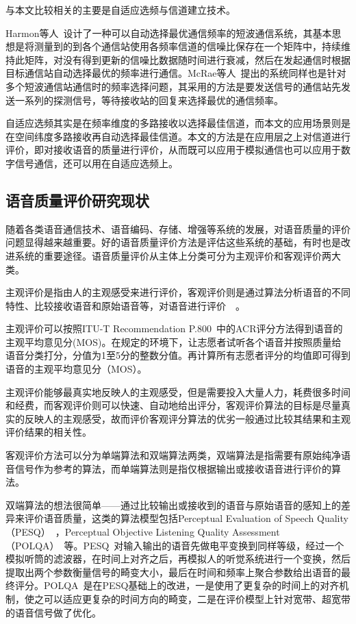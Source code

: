与本文比较相关的主要是自适应选频与信道建立技术。

Harmon等人~\cite{harmon1982adaptive}设计了一种可以自动选择最优通信频率的短波通信系统，其基本思想是将测量到的到各个通信站使用各频率信道的信噪比保存在一个矩阵中，持续维持此矩阵，对没有得到更新的信噪比数据随时间进行衰减，然后在发起通信时根据目标通信站自动选择最优的频率进行通信。McRae等人~\cite{mcrae1989frequency}提出的系统同样也是针对多个短波通信站通信时的频率选择问题，其采用的方法是要发送信号的通信站先发送一系列的探测信号，等待接收站的回复来选择最优的通信频率。

自适应选频其实是在频率维度的多路接收以选择最佳信道，而本文的应用场景则是在空间纬度多路接收再自动选择最佳信道。本文的方法是在应用层之上对信道进行评价，即对接收语音的质量进行评价，从而既可以应用于模拟通信也可以应用于数字信号通信，还可以用在自适应选频上。

\subsection{语音质量评价研究现状}

随着各类语音通信技术、语音编码、存储、增强等系统的发展，对语音质量的评价问题显得越来越重要。好的语音质量评价方法是评估这些系统的基础，有时也是改进系统的重要途径。语音质量评价从主体上分类可分为主观评价和客观评价两大类。

主观评价是指由人的主观感受来进行评价，客观评价则是通过算法分析语音的不同特性、比较接收语音和原始语音等，对语音进行评价~\cite{肖累累2013语音质量客观评价方法的研究}~\cite{moller2011speech}。

主观评价可以按照ITU-T Recommendation P.800~\cite{rec1996p}中的ACR评分方法得到语音的主观平均意见分(MOS)。在规定的环境下，让志愿者试听各个语音并按照质量给语音分类打分，分值为1至5分的整数分值。再计算所有志愿者评分的均值即可得到语音的主观平均意见分（MOS）。

主观评价能够最真实地反映人的主观感受，但是需要投入大量人力，耗费很多时间和经费，而客观评价则可以快速、自动地给出评分，客观评价算法的目标是尽量真实的反映人的主观感受，故而评价客观评分算法的优劣一般通过比较其结果和主观评价结果的相关性。

客观评价方法可以分为单端算法和双端算法两类，双端算法是指需要有原始纯净语音信号作为参考的算法，而单端算法则是指仅根据输出或接收语音进行评价的算法。

双端算法的想法很简单——通过比较输出或接收到的语音与原始语音的感知上的差异来评价语音质量，这类的算法模型包括Perceptual Evaluation of Speech Quality（PESQ）~\cite{recommendation2001perceptual}，Perceptual Objective Listening Quality Assessment（POLQA）~\cite{rec2011p}等。PESQ~\cite{recommendation2001perceptual}对输入输出的语音先做电平变换到同样等级，经过一个模拟听筒的滤波器，在时间上对齐之后，再模拟人的听觉系统进行一个变换，然后提取出两个参数衡量信号的畸变大小，最后在时间和频率上聚合参数给出语音的最终评分。POLQA~\cite{rec2011p}是在PESQ基础上的改进，一是使用了更复杂的时间上的对齐机制，使之可以适应更复杂的时间方向的畸变，二是在评价模型上针对宽带、超宽带的语音信号做了优化。

